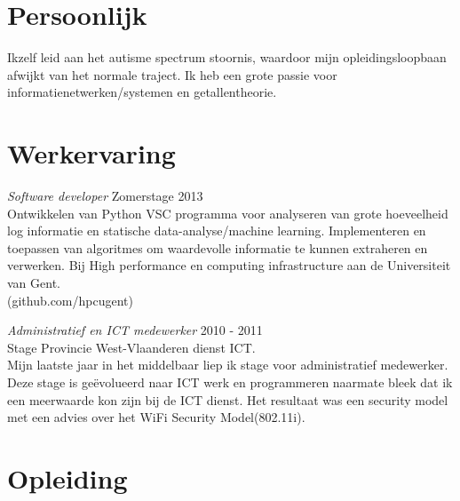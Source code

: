 \documentclass[margin, 10pt]{res} %
\begin{document}
\begin{resume}

 
\section{Persoonlijk}  
Ikzelf leid aan het autisme spectrum stoornis, waardoor mijn opleidingsloopbaan afwijkt van het normale traject. Ik heb een grote passie voor informatienetwerken/systemen en getallentheorie.

\section{Werkervaring}
{\sl Software developer} \hfill Zomerstage 2013 \\
Ontwikkelen van Python VSC programma voor analyseren van grote hoeveelheid log informatie en statische data-analyse/machine learning. Implementeren en toepassen van algoritmes om waardevolle informatie te kunnen extraheren en verwerken.
Bij High performance en computing infrastructure aan de Universiteit van Gent.\\ (github.com/hpcugent)

{\sl Administratief en ICT medewerker} \hfill 2010 - 2011 \\
Stage Provincie West-Vlaanderen dienst ICT. \\
Mijn laatste jaar in het middelbaar liep ik stage voor administratief medewerker. Deze stage is ge\"evolueerd naar ICT werk en programmeren naarmate bleek dat ik een meerwaarde kon zijn bij de ICT dienst. Het resultaat was een security model met een advies over het WiFi Security Model(802.11i).

\section{Opleiding}


\end{resume}
\end{document}
